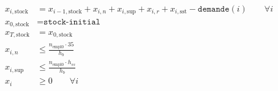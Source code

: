 \documentclass[12pt,oneside,a4paper]{article}
\begin{document}
\begin{align*}
  x_{i,\text{stock}} &= x_{i-1,\text{stock}} + x_{i,n} + x_{i,\text{sup}} 
  + x_{i,r} + x_{i,\text{sst}} - \texttt{demande}(i) \qquad \forall i \\
  x_{0,\text{stock}} &= \texttt{stock-initial} \\
  x_{T,\text{stock}} &= x_{0,\text{stock}} \\
  x_{i,n} &\leq \frac{n_{\text{empl0}} \cdot 35}{h_b} \\
  x_{i,\text{sup}} &\leq \frac{n_{\text{empl0}} \cdot h_{ss}}{h_{b}} \\
  x_i &\geq 0 \qquad \forall i \\
\end{align*}
\end{document}
